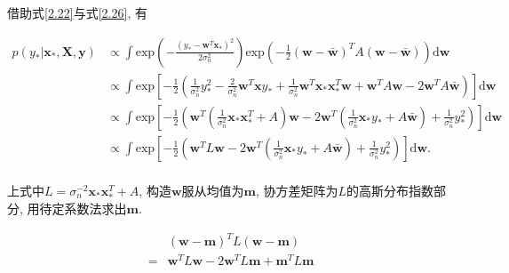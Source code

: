         借助式\ref{2.22}与式\ref{2.26}, 有


        \begin{equation}
        \begin{aligned}\label{A4.15}
            p(y_{*}|\boldsymbol{x}_{*},\boldsymbol{X},\boldsymbol{y})
            &\propto\int\mathrm{exp}\left(-\frac{(y_{*}-\boldsymbol{w}^{T}\boldsymbol{x}_{*})^{2}}{2\sigma^{2}_{n}} \right)\mathrm{exp}\left( -\frac{1}{2}(\boldsymbol{w}-\boldsymbol{\bar{w}})^{T}A(\boldsymbol{w}-\boldsymbol{\bar{w}}) \right)\mathrm{d}\boldsymbol{w} \\
            &\propto\int\mathrm{exp}\left[ -\frac{1}{2}\left(\frac{1}{\sigma^{2}_{n}}y_{*}^{2} - \frac{2}{\sigma^{2}_{n}}\boldsymbol{w}^{T}\boldsymbol{x}y_{*} + \frac{1}{\sigma^{2}_{n}}\boldsymbol{w}^{T}\boldsymbol{x}_{*}\boldsymbol{x}_{*}^{T}\boldsymbol{w} + \boldsymbol{w}^{T}A\boldsymbol{w} - 2\boldsymbol{w}^{T}A\boldsymbol{\bar{w}} \right)\right] \mathrm{d}\boldsymbol{w} \\
            &\propto\int\mathrm{exp}\left[ -\frac{1}{2}\left( \boldsymbol{w}^{T}(\frac{1}{\sigma^{2}_{n}}\boldsymbol{x}_{*}\boldsymbol{x}^{T}_{*}+A )\boldsymbol{w} - 2\boldsymbol{w}^{T}(\frac{1}{\sigma^{2}_{n}}\boldsymbol{x}_{*}y_{*}+A\boldsymbol{\bar{w}} ) + \frac{1}{\sigma^{2}_{n}}y^{2}_{*} \right)\right] \mathrm{d}\boldsymbol{w} \\
            &\propto\int\mathrm{exp}\left[ -\frac{1}{2}\left( \boldsymbol{w}^{T}L\boldsymbol{w} - 2\boldsymbol{w}^{T}(\frac{1}{\sigma^{2}_{n}}\boldsymbol{x}_{*}y_{*}+A\boldsymbol{\bar{w}} ) + \frac{1}{\sigma^{2}_{n}}y^{2}_{*} \right)\right]\mathrm{d}\boldsymbol{w}. \\
        \end{aligned}
        \end{equation}

        上式中$L=\sigma^{-2}_{n}\boldsymbol{x}_{*}\boldsymbol{x}^{T}_{*}+A$, 构造$\boldsymbol{w}$服从均值为$\boldsymbol{m}$, 协方差矩阵为$L$的高斯分布指数部分, 用待定系数法求出$\boldsymbol{m}$.

        \begin{equation}\label{A4.16}
            \begin{aligned}
                &(\boldsymbol{w}-\boldsymbol{m})^{T}L(\boldsymbol{w}-\boldsymbol{m}) \\
                =&\boldsymbol{w}^{T}L\boldsymbol{w}-2\boldsymbol{w}^{T}L\boldsymbol{m}+\boldsymbol{m}^{T}L\boldsymbol{m}
            \end{aligned}
        \end{equation}

